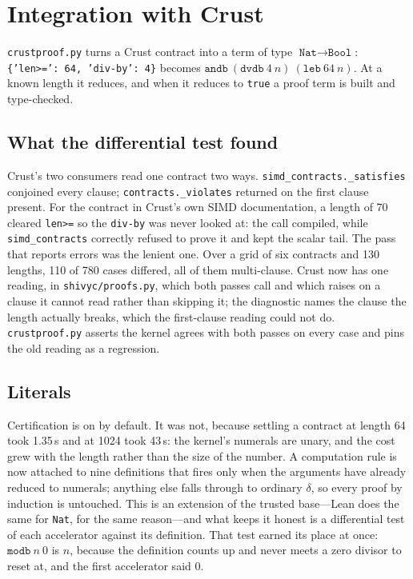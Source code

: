 \documentclass[11pt]{article}
\newcommand{\code}[1]{\texttt{#1}}
\begin{document}
\section{Integration with Crust}
\label{sec:crust}

\code{crustproof.py} turns a Crust contract into a term of type
$\code{Nat} \to \code{Bool}$: \code{\{'len>=': 64, 'div-by': 4\}} becomes
$\code{andb}\ (\code{dvdb}\ 4\ n)\ (\code{leb}\ 64\ n)$. At a known length it
reduces, and when it reduces to \code{true} a proof term is built and
type-checked.

\subsection{What the differential test found}

Crust's two consumers read one contract two ways.
\code{simd\_contracts.\_satisfies} conjoined every clause;
\code{contracts.\_violates} returned on the first clause present. For the
contract in Crust's own SIMD documentation, a length of 70 cleared
\code{len>=} so the \code{div-by} was never looked at: the call compiled,
while \code{simd\_contracts} correctly refused to prove it and kept the scalar
tail. The pass that reports errors was the lenient one. Over a grid of six
contracts and 130 lengths, 110 of 780 cases differed, all of them
multi-clause. Crust now has one reading, in \code{shivyc/proofs.py}, which
both passes call and which raises on a clause it cannot read rather than
skipping it; the diagnostic names the clause the length actually breaks, which
the first-clause reading could not do. \code{crustproof.py} asserts the kernel
agrees with both passes on every case and pins the old reading as a
regression.

\subsection{Literals}

Certification is on by default. It was not, because settling a contract at
length 64 took 1.35\,s and at 1024 took 43\,s: the kernel's numerals are unary,
and the cost grew with the length rather than the size of the number. A
computation rule is now attached to nine definitions that fires only when the
arguments have already reduced to numerals; anything else falls through to
ordinary $\delta$, so every proof by induction is untouched. This is an
extension of the trusted base---Lean does the same for \code{Nat}, for the
same reason---and what keeps it honest is a differential test of each
accelerator against its definition. That test earned its place at once:
$\code{modb}\ n\ 0$ is $n$, because the definition counts up and never meets a
zero divisor to reset at, and the first accelerator said $0$.
\end{document}
